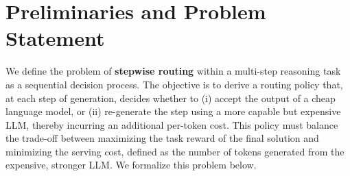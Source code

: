 \documentclass{article}
\theoremstyle{plain}
\theoremstyle{definition}
\theoremstyle{remark}
\newcommand{\ignore}[1]{}
\begin{document}


\ignore{The key distinction of our work is the shift from query-level to step-level routing granularity, enabling targeted interventions precisely where stronger models can prevent cascading errors in multi-step reasoning tasks. While AutoMix~\citep{automix} provides a POMDP framework for single-step routing decisions, our POMDP formulation extends this to multi-step settings where long-horizon planning becomes crucial for effective cost-performance trade-offs.}

\vspace{-0.2cm}
\section{Preliminaries and Problem Statement}
\vspace{-0.2cm}
We define the problem of \textbf{stepwise routing} within a multi-step reasoning task as a sequential decision process. The objective is to derive a routing policy that, at each step of generation, decides whether to (i) accept the output of a cheap language model, or (ii) re-generate the step using a more capable but expensive LLM, thereby incurring an additional per-token cost.  This policy must balance the trade-off between maximizing the task reward of the final solution and minimizing the serving cost, defined as the number of tokens generated from the expensive, stronger LLM. We formalize this problem below.
\end{document}
